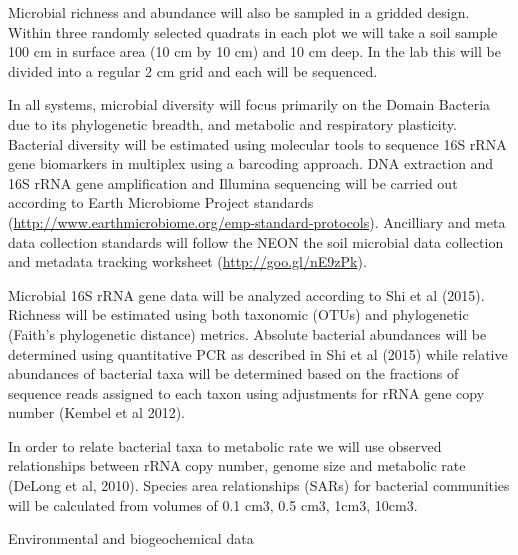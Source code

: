 \documentclass[11pt]{article}
\makeatletter
\renewcommand{\paragraph}{\@startsection{paragraph}{4}{\z@}
  {1ex \@plus 1ex \@minus .2ex}{-1em}
  {\normalfont\normalsize\it}
}
\makeatother
\begin{document}
Microbial richness and abundance will also be sampled in a gridded
design.  Within three randomly selected quadrats in each plot we will
take a soil sample 100 cm in surface area (10 cm by 10 cm) and 10 cm
deep.  In the lab this will be divided into a regular 2 cm grid and
each will be sequenced.

In all systems, microbial diversity will focus primarily on the Domain
Bacteria due to its phylogenetic breadth, and metabolic and
respiratory plasticity. Bacterial diversity will be estimated using
molecular tools to sequence 16S rRNA gene biomarkers in multiplex
using a barcoding approach. DNA extraction and 16S rRNA gene
amplification and Illumina sequencing will be carried out according to
Earth Microbiome Project standards
(\url{http://www.earthmicrobiome.org/emp-standard-protocols}). Ancilliary
and meta data collection standards will follow the NEON the soil
microbial data collection and metadata tracking worksheet
(\url{http://goo.gl/nE9zPk}). 

Microbial 16S rRNA gene data will be analyzed according to Shi et al
(2015). Richness will be estimated using both taxonomic (OTUs) and
phylogenetic (Faith's phylogenetic distance) metrics. Absolute
bacterial abundances will be determined using quantitative PCR as
described in Shi et al (2015) while relative abundances of bacterial
taxa will be determined based on the fractions of sequence reads
assigned to each taxon using adjustments for rRNA gene copy number
(Kembel et al 2012).

In order to relate bacterial taxa to metabolic rate we will use
observed relationships between rRNA copy number, genome size and
metabolic rate (DeLong et al, 2010).  Species area relationships
(SARs) for bacterial communities will be calculated from volumes of
0.1 cm3, 0.5 cm3, 1cm3, 10cm3.




\paragraph{Environmental and biogeochemical data}
\end{document}
